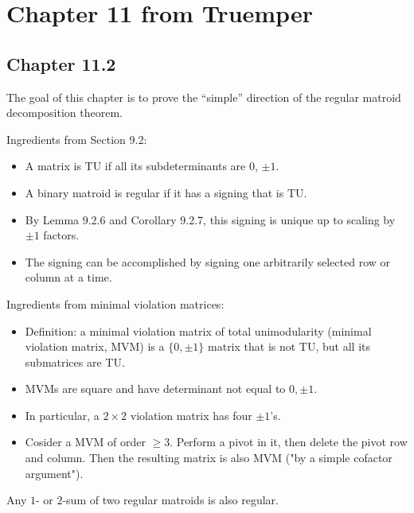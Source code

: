 \section{Chapter 11 from Truemper}

\subsection{Chapter 11.2}

The goal of this chapter is to prove the ``simple'' direction of the regular matroid decomposition theorem.


Ingredients from Section 9.2:
\begin{itemize}
  \item A matrix is TU if all its subdeterminants are $0$, $\pm 1$.
  \item A binary matroid is regular if it has a signing that is TU.
  \item By Lemma 9.2.6 and Corollary 9.2.7, this signing is unique up to scaling by $\pm 1$ factors.
  \item The signing can be accomplished by signing one arbitrarily selected row or column at a time.
\end{itemize}

Ingredients from minimal violation matrices:
\begin{itemize}
  \item Definition: a minimal violation matrix of total unimodularity (minimal violation matrix, MVM) is a $\{0, \pm 1\}$ matrix that is not TU, but all its submatrices are TU.
  \item MVMs are square and have determinant not equal to $0, \pm 1$.
  \item In particular, a $2 \times 2$ violation matrix has four $\pm 1$'s.
  \item Cosider a MVM of order $\ge 3$. Perform a pivot in it, then delete the pivot row and column. Then the resulting matrix is also MVM ("by a simple cofactor argument").
\end{itemize}

\begin{lemma}[11.2.1]
  \label{lem:11.2.1}
  Any $1$- or $2$-sum of two regular matroids is also regular.
\end{lemma}

